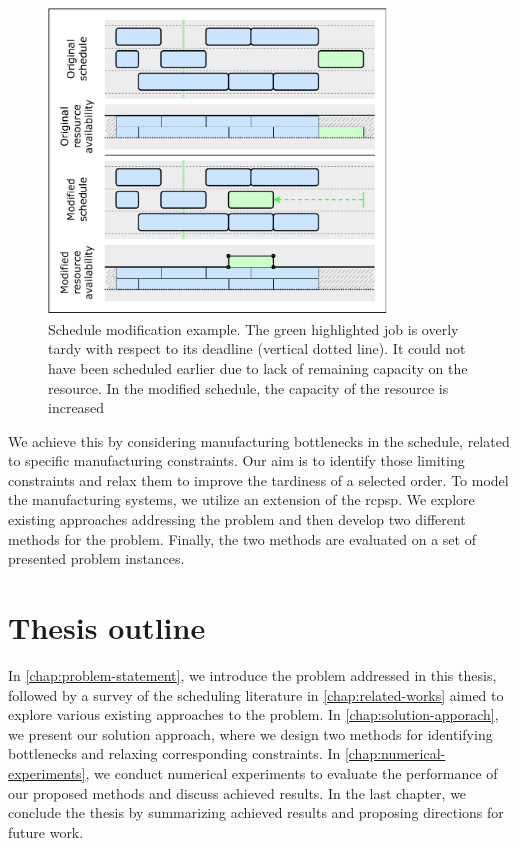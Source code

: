 \begin{figure}
    \centering
    \includegraphics[width=0.8\textwidth]{img/Schedule-Change.pdf}
    \caption{
        Schedule modification example.
        The green highlighted job is overly tardy with respect to its deadline (vertical dotted line).
        It could not have been scheduled earlier due to lack of remaining capacity on the resource.
        In the modified schedule, the capacity of the resource is increased 
        }
    \label{fig:schedule-change}
\end{figure}

We achieve this by considering manufacturing bottlenecks in the schedule,
related to specific manufacturing constraints.
Our aim is to identify those limiting constraints
and relax them to improve the tardiness of a selected order.
To model the manufacturing systems, we utilize an extension of the \acf{rcpsp}.
We explore existing approaches addressing the problem
and then develop two different methods for the problem.
Finally, the two methods are evaluated on a set of presented problem instances.

\section*{Thesis outline} \label{sec:introduction/thesis-outline}

In \cref{chap:problem-statement}, we introduce the problem addressed in this thesis,
followed by a survey of the scheduling literature in \cref{chap:related-works}
aimed to explore various existing approaches to the problem.
In \cref{chap:solution-apporach}, we present our solution approach,
where we design two methods for identifying bottlenecks and relaxing corresponding constraints.
In \cref{chap:numerical-experiments}, we conduct numerical experiments to evaluate the performance
of our proposed methods and discuss achieved results.
In the last chapter, we conclude the thesis by summarizing achieved results
and proposing directions for future work.
